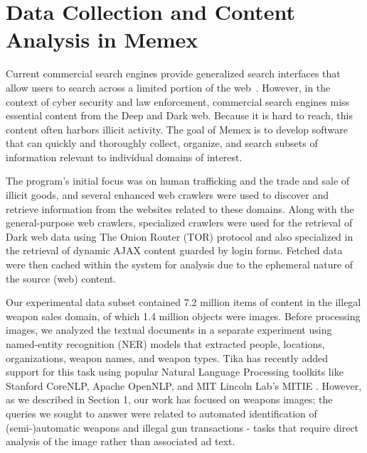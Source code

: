 \section{Data Collection and Content Analysis in Memex}
\label{sec:memex-data}
Current commercial search engines provide generalized search interfaces that allow users to search across a limited portion of the web~\cite{fbo-memex}. However, in the context of cyber security and law enforcement, commercial search engines miss essential content from the Deep and Dark web. Because it is hard to reach, this content often harbors illicit activity. The goal of Memex is to develop software that can quickly and thoroughly collect, organize, and search subsets of information relevant to individual domains of interest. 

The program's initial focus was on human trafficking and the trade and sale of illicit goods, and several enhanced web crawlers were used to discover and retrieve information from the websites related to these domains. Along with the general-purpose web crawlers, specialized crawlers were used for the retrieval of Dark web data using The Onion Router (TOR) protocol \cite{mentor2016onion} and also specialized in the retrieval of dynamic AJAX content guarded by login forms. Fetched data were then cached within the system for analysis due to the ephemeral nature of the source (web) content.

Our experimental data subset contained 7.2 million items of content in the illegal weapon sales domain, of which 1.4 million objects were images. Before processing images, we analyzed the textual documents in a separate experiment using named-entity recognition (NER) models that extracted people, locations, organizations, weapon names, and weapon types. Tika has recently added support for this task using popular Natural Language Processing toolkits like Stanford CoreNLP\cite{Finkel:2005:INI:1219840.1219885}, Apache OpenNLP\cite{ApacheOpenNLP}, and MIT Lincoln Lab's MITIE \cite{MITIE-github}. However, as we described in Section 1, our work has focused on weapons images; the queries we sought to answer were related to automated identification of (semi-)automatic weapons and illegal gun transactions - tasks that require direct analysis of the image rather than associated ad text.

